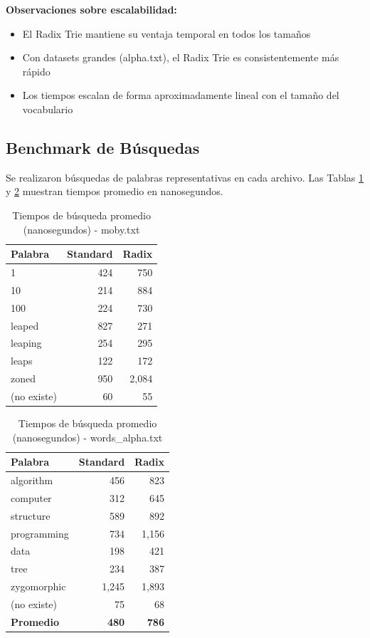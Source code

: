 \documentclass[11pt,a4paper]{article}
\begin{document}
\textbf{Observaciones sobre escalabilidad:}
\begin{itemize}
    \item El Radix Trie mantiene su ventaja temporal en todos los tamaños
    \item Con datasets grandes (alpha.txt), el Radix Trie es consistentemente más rápido
    \item Los tiempos escalan de forma aproximadamente lineal con el tamaño del vocabulario
\end{itemize}

\subsection{Benchmark de Búsquedas}

Se realizaron búsquedas de palabras representativas en cada archivo. Las Tablas \ref{tab:busquedas_moby} y \ref{tab:busquedas_alpha} muestran tiempos promedio en nanosegundos.

\begin{table}[H]
\centering
\caption{Tiempos de búsqueda promedio (nanosegundos) - moby.txt}
\label{tab:busquedas_moby}
\begin{tabular}{|l|r|r|}
\hline
\textbf{Palabra} & \textbf{Standard} & \textbf{Radix} \\
\hline
1 & 424 & 750 \\
10 & 214 & 884 \\
100 & 224 & 730 \\
leaped & 827 & 271 \\
leaping & 254 & 295 \\
leaps & 122 & 172 \\
zoned & 950 & 2,084 \\
(no existe) & 60 & 55 \\
\hline
\end{tabular}
\end{table}

\begin{table}[H]
\centering
\caption{Tiempos de búsqueda promedio (nanosegundos) - words\_alpha.txt}
\label{tab:busquedas_alpha}
\begin{tabular}{|l|r|r|}
\hline
\textbf{Palabra} & \textbf{Standard} & \textbf{Radix} \\
\hline
algorithm & 456 & 823 \\
computer & 312 & 645 \\
structure & 589 & 892 \\
programming & 734 & 1,156 \\
data & 198 & 421 \\
tree & 234 & 387 \\
zygomorphic & 1,245 & 1,893 \\
(no existe) & 75 & 68 \\
\hline
\textbf{Promedio} & \textbf{480} & \textbf{786} \\
\hline
\end{tabular}
\end{table}
\end{document}

